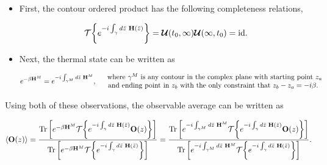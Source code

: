 \begin{itemize}
    \item First, the contour ordered product has the following completeness relations,

    \[
        \mathcal{T}\bigg\{
            e^{-i \int_{\gamma} d\bar{z} \textnormal{ } {\bf H}(\bar{z})}
        \bigg\} = \bm{\mathcal{U}}(t_0, \infty) \bm{\mathcal{U}}(\infty, t_0) = \textnormal{id}.
    \]
    
    \item Next, the thermal state can be written as 

    \[
        e^{-\beta {\bf H}^M} = e^{-i \int_{\gamma^M} d\bar{z} \textnormal{ } {\bf H}^M}, \quad \begin{array}{cc}
             \textnormal{where $\gamma^M$ is any contour in the complex plane with starting point $z_a$} \\
             \textnormal{and ending point in $z_b$ with the only constraint that $z_b - z_a = -i \beta$. }
        \end{array}
    \]
    
\end{itemize}

Using both of these observations, the observable average can be written as 

\begin{equation}
     \langle {\bf O}(z) \rangle = \frac{\Tr \bigg[ e^{-\beta {\bf H}^M} \mathcal{T} \bigg\{
            e^{-i \int_{\gamma} d\bar{z} \textnormal{ } {\bf H}(\bar{z})} {\bf O}(z) 
        \bigg\}\bigg]}
        {\Tr \bigg[ e^{-\beta {\bf H}^M} \mathcal{T} \bigg\{
            e^{-i \int_{\gamma} d\bar{z} \textnormal{ } {\bf H}(\bar{z})} 
        \bigg\}\bigg] } = 
        \frac{\Tr \bigg[ e^{-i \int_{\gamma^M} d\bar{z} \textnormal{ } {\bf H}^M} \mathcal{T} \bigg\{
            e^{-i \int_{\gamma} d\bar{z} \textnormal{ } {\bf H}(\bar{z})} {\bf O}(z) 
        \bigg\}\bigg]}
        {\Tr \bigg[ e^{-i \int_{\gamma^M} d\bar{z} \textnormal{ } {\bf H}^M} \mathcal{T} \bigg\{
            e^{-i \int_{\gamma} d\bar{z} \textnormal{ } {\bf H}(\bar{z})} 
        \bigg\}\bigg] }.
\end{equation}

